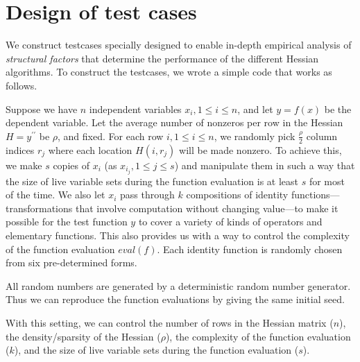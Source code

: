 \documentclass[10pt, a4paper, english]{article}
\begin{document}
\section*{Design of test cases}

We construct testcases specially designed to enable in-depth empirical analysis of {\em structural factors} that determine the performance of the  different Hessian algorithms. 
To construct the testcases, we wrote a simple code that works as follows. 

Suppose we have $n$ independent variables $x_i, 1 \le i \le n$, and let $y = f(x)$ be the dependent variable. Let the average number of nonzeros per row in the Hessian $H = y^{\prime\prime}$ be $\rho$, and fixed. 
For each row $i, 1 \le i \le n$, we randomly pick $\frac{\rho}{2}$ column indices $r_j$ where each location $H(i, r_j)$ will be made nonzero. 
To achieve this, we make $s$ copies of $x_i$ (as $x_{i_j}, 1 \le j \le s$) and manipulate them in such a way that the size of live variable sets during the function evaluation is at least $s$ for most of the time. We also let $x_i$ pass through $k$ compositions of identity functions---transformations that involve computation without changing value---to make it possible for the test function $y$ to cover a variety of kinds of operators and elementary functions. This also provides us with a way to control the complexity of the function evaluation $eval(f)$. Each identity function is randomly chosen from six pre-determined forms. 

All random numbers are generated by a deterministic random number generator. Thus we can reproduce the function evaluations by giving the same initial seed.

With this setting, we can control the number of rows in the Hessian matrix ($n$), the density/sparsity of the Hessian ($\rho$), the complexity of the function evaluation ($k$), and the size of live variable sets during the function evaluation ($s$).
\end{document}
